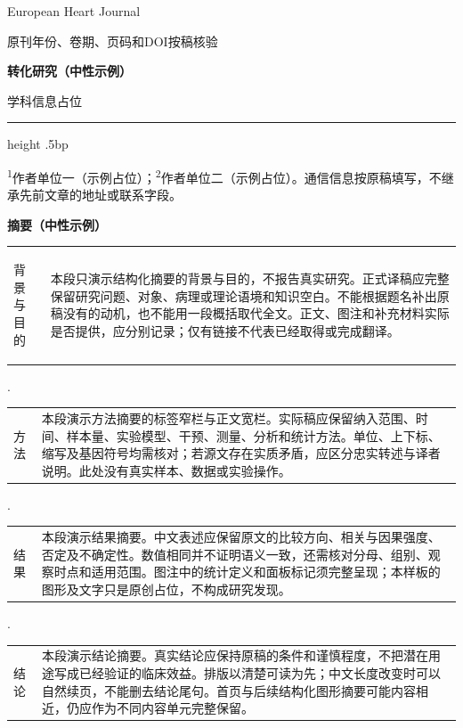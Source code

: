\documentclass[UTF8,fontset=none,scheme=plain]{ctexart}
\makeatletter
\renewcommand{\normalsize}{\fontsize{9bp}{12.1bp}\selectfont}
\renewcommand{\headrulewidth}{.5bp}
\newcommand{\EHJDotRule}{\par\vspace{3bp}\noindent\leaders\hbox{\kern1bp.\kern1bp}\hfill\kern0pt\par\vspace{4bp}}
\newenvironment{ehjpanel}{\par\noindent\begingroup\setlength{\fboxsep}{8bp}\begin{lrbox}{\EHJPanelBox}\begin{minipage}{\dimexpr\linewidth-16bp\relax}\sffamily}{\end{minipage}\end{lrbox}\colorbox{EHJBeige}{\usebox{\EHJPanelBox}}\endgroup\par}
\newcommand{\EHJRow}[2]{\noindent\begin{tabularx}{\linewidth}{@{}>{\bfseries\raggedright\arraybackslash}p{.15\linewidth}X@{}}#1 & #2\end{tabularx}\par}
\makeatother
\begin{document}
\sffamily\normalsize
\fancypagestyle{ehjfirst}{\fancyhead{}\renewcommand{\headrulewidth}{0pt}}
\thispagestyle{ehjfirst}
\noindent\begin{minipage}[b]{.57\textwidth}
{\fontsize{14bp}{17bp}\selectfont European Heart Journal\par}
{\fontsize{8bp}{10bp}\selectfont 原刊年份、卷期、页码和DOI按稿核验\par}
\end{minipage}\hfill\begin{minipage}[b]{.40\textwidth}\raggedleft
{\bfseries\color{EHJRed}\fontsize{13bp}{16bp}\selectfont 转化研究（中性示例）\par}
{\fontsize{10bp}{12bp}\selectfont 学科信息占位\par}
\end{minipage}\par\vspace{9bp}
{\color{EHJRed}\hrule height .5bp}\vspace{20bp}
\vspace{13bp}
\vspace{9bp}
{\fontsize{7.5bp}{10bp}\selectfont\noindent\textsuperscript{1}作者单位一（示例占位）；\textsuperscript{2}作者单位二（示例占位）。通信信息按原稿填写，不继承先前文章的地址或联系字段。\par}
\vspace{16bp}
\begin{ehjpanel}
\textbf{\color{EHJRed}摘要（中性示例）}\par\vspace{8bp}
\EHJRow{背景与目的}{本段只演示结构化摘要的背景与目的，不报告真实研究。正式译稿应完整保留研究问题、对象、病理或理论语境和知识空白。不能根据题名补出原稿没有的动机，也不能用一段概括取代全文。正文、图注和补充材料实际是否提供，应分别记录；仅有链接不代表已经取得或完成翻译。}
\EHJDotRule
\EHJRow{方法}{本段演示方法摘要的标签窄栏与正文宽栏。实际稿应保留纳入范围、时间、样本量、实验模型、干预、测量、分析和统计方法。单位、上下标、缩写及基因符号均需核对；若源文存在实质矛盾，应区分忠实转述与译者说明。此处没有真实样本、数据或实验操作。}
\EHJDotRule
\EHJRow{结果}{本段演示结果摘要。中文表述应保留原文的比较方向、相关与因果强度、否定及不确定性。数值相同并不证明语义一致，还需核对分母、组别、观察时点和适用范围。图注中的统计定义和面板标记须完整呈现；本样板的图形及文字只是原创占位，不构成研究发现。}
\EHJDotRule
\EHJRow{结论}{本段演示结论摘要。真实结论应保持原稿的条件和谨慎程度，不把潜在用途写成已经验证的临床效益。排版以清楚可读为先；中文长度改变时可以自然续页，不能删去结论尾句。首页与后续结构化图形摘要可能内容相近，仍应作为不同内容单元完整保留。}
\end{ehjpanel}
\end{document}
